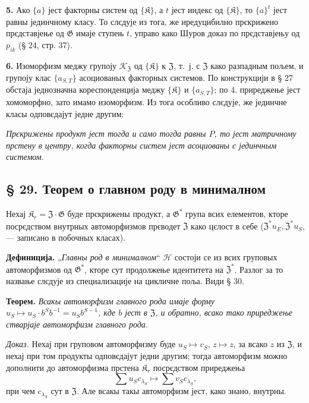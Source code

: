 \documentclass[11pt]{article}
\begin{document}
\noindent\textbf{5.} Ако \(\{a\}\) јест факторны систем од \(\{\mathfrak K\}\), а \(t\) јест индекс од \(\{\mathfrak K\}\), то \(\{a\}^t\) јест равны јединчному класу. То слєдује из тога, же иредуцибилно прєкрижено прєдставјење од \(\mathfrak G\) имаје ступењ \(t\), управо како Шуров доказ по прєдставјењу од \(p_{ik}\) (§ 24, стр. 37).

\noindent\textbf{6.} Изоморфизм меджу групоју \(\mathscr K_{\mathfrak Z}\) од \(\{\mathfrak K\}\) к \(\mathfrak Z\), т.~ј. с \(\mathfrak Z\) како разпадным пољем, и групоју клас \(\{a_{S,T}\}\) асоциованых факторных системов. По конструкцији в § 27 обстаја једнозначна кореспонденција меджу \(\{\mathfrak K\}\) и \(\{a_{S,T}\}\); по 4. приреджење јест хомоморфно, зато имамо изоморфизм. Из тога особливо слєдује, же јединчне класы одповєдајут једне другим:

\noindent\emph{Прєкрижены продукт јест тогда и само тогда равны \(P\), то јест матричному прстену в центру, когда факторны систем јест асоциованы с јединчным системом.}

\subsection*{§ 29. Теорем о главном роду в минималном}\label{hauptgeschlechtssatz-im-minimalen}

Нехај \(\mathfrak K_r=\mathfrak Z\cdot\mathfrak G\) буде прєкрижены продукт, а \(\mathfrak G^*\) група всих елементов, кторе посрєдством внутрных автоморфизмов прєводет \(\mathfrak Z\) како цєлост в себе (\(\mathfrak Z^*u_E,\mathfrak Z^*u_S\), --- записано в побочных класах).

\noindent\textbf{Дефиниција.} „\emph{Главны род в минималном}“ \(\mathscr H\) состоји се из всих груповых автоморфизмов од \(\mathfrak G^*\), кторе сут продолжење идентитета на \(\mathfrak Z^*\). Разлог за то назвање слєдује из специализације на цикличне поља. Види § 30.

\noindent\textbf{Теорем.} \emph{Всакы автоморфизм главного рода имаје форму \(u_S\mapsto u_S\cdot b^Sb^{-1}=u_Sb^{S-1}\), кде \(b\) јест в \(\mathfrak Z\), и обратно, всако тако приреджење стварјаје автоморфизм главного рода.}

\noindent\emph{Доказ.} Нехај при груповом автоморфизму буде \(u_S\mapsto v_S\), \(z\mapsto z\), за всако \(z\) из \(\mathfrak Z\), и нехај при том продукты одповєдајут једни другим; тогда автоморфизм можно дополнити до автоморфизма прстена \(\mathfrak K_r\) посрєдством приреджења
\[
\sum u_Sc_{\lambda_S}\mapsto\sum v_Sc_{\lambda_S},
\]
при чем \(c_{\lambda_S}\) сут в \(\mathfrak Z\). Але всакы такы автоморфизм јест, како знано, внутрны.
\end{document}
